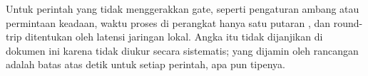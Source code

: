 Untuk perintah yang tidak menggerakkan gate, seperti pengaturan ambang atau
permintaan keadaan, waktu proses di perangkat hanya satu putaran ,
dan round-trip ditentukan oleh latensi jaringan lokal. Angka itu tidak dijanjikan
di dokumen ini karena tidak diukur secara sistematis; yang dijamin oleh rancangan
adalah batas atas \CmdTimeoutS{} detik untuk setiap perintah, apa pun tipenya.
